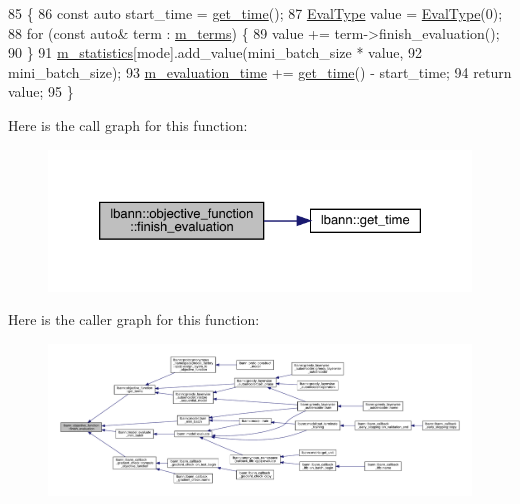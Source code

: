 \begin{DoxyCode}
85                                                                     \{
86   \textcolor{keyword}{const} \textcolor{keyword}{auto} start\_time = \hyperlink{namespacelbann_a478d36031ff0659893c4322cd856157f}{get\_time}();
87   \hyperlink{base_8hpp_a3266f5ac18504bbadea983c109566867}{EvalType} value = \hyperlink{base_8hpp_a3266f5ac18504bbadea983c109566867}{EvalType}(0);
88   \textcolor{keywordflow}{for} (\textcolor{keyword}{const} \textcolor{keyword}{auto}& term : \hyperlink{classlbann_1_1objective__function_aea9c1f90ba9af1b1330efa2ba6adb5e2}{m\_terms}) \{
89     value += term->finish\_evaluation();
90   \}
91   \hyperlink{classlbann_1_1objective__function_ad5daa18c52374a849c6fbd515bcc1eb1}{m\_statistics}[mode].add\_value(mini\_batch\_size * value,
92                                mini\_batch\_size);
93   \hyperlink{classlbann_1_1objective__function_a9ef17c7204cd371261c9c083d86de91a}{m\_evaluation\_time} += \hyperlink{namespacelbann_a478d36031ff0659893c4322cd856157f}{get\_time}() - start\_time;
94   \textcolor{keywordflow}{return} value;
95 \}
\end{DoxyCode}
Here is the call graph for this function\+:\nopagebreak
\begin{figure}[H]
\begin{center}
\leavevmode
\includegraphics[width=326pt]{classlbann_1_1objective__function_ad35ce9b7daa87d197d00b1762b691a02_cgraph}
\end{center}
\end{figure}
Here is the caller graph for this function\+:\nopagebreak
\begin{figure}[H]
\begin{center}
\leavevmode
\includegraphics[width=350pt]{classlbann_1_1objective__function_ad35ce9b7daa87d197d00b1762b691a02_icgraph}
\end{center}
\end{figure}
\mbox{\label{classlbann_1_1objective__function_af968b6949c170721d04895f1268b03dd}} 
